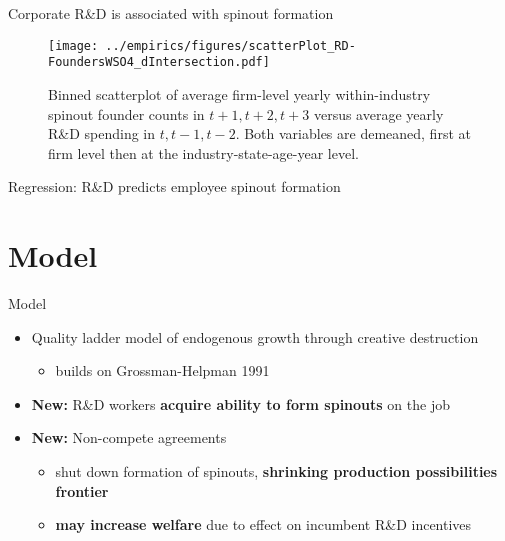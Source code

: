 \documentclass[english,usenames,dvipsnames]{beamer}
\begin{document}
\begin{frame}{Corporate R\&D is associated with spinout formation}
	\begin{figure}[!htb]
		\centering
		\texttt{[image: ../empirics/figures/scatterPlot\_RD-FoundersWSO4\_dIntersection.pdf]}
		\caption{\footnotesize Binned scatterplot of average firm-level yearly within-industry spinout founder counts in $t+1,t+2,t+3$ versus average yearly R\&D spending in $t,t-1,t-2$. Both variables are demeaned, first at firm level then at the industry-state-age-year level.}
	\end{figure}
\end{frame}

\begin{frame}{Regression: R\&D predicts employee spinout formation}
	\begin{table}
		\tiny
		\centering
		
		\caption{\scriptsize The dependent variable is average yearly number of founders joining WSOs in years $t+1,t+2,t+3$. The independent variables are averages over $t,t-1,t-2$. Firm controls include are employment, assets, intangible assets, investment, net income, cumulative citation-weighted patents, and Tobin's Q.}
	\end{table}
\end{frame}


\section{Model}

\begin{frame}
	\tableofcontents[currentsection]
\end{frame}

\begin{frame}{Model}
	\begin{itemize}	
		\item Quality ladder model of endogenous growth through creative destruction 
		\begin{itemize}
			\item builds on Grossman-Helpman 1991
		\end{itemize}
		\medskip
		\item \alert{\textbf{New:}} R\&D workers \textbf{\alert{acquire ability to form spinouts}} on the job
		\medskip
		\item \alert{\textbf{New:}} Non-compete agreements
		\begin{itemize}
			\item shut down formation of spinouts, \textbf{\alert{shrinking production possibilities frontier}}
			\item \textbf{\alert{may increase welfare}} due to effect on incumbent R\&D incentives
		\end{itemize}
	\end{itemize}
\end{frame}
\end{document}

